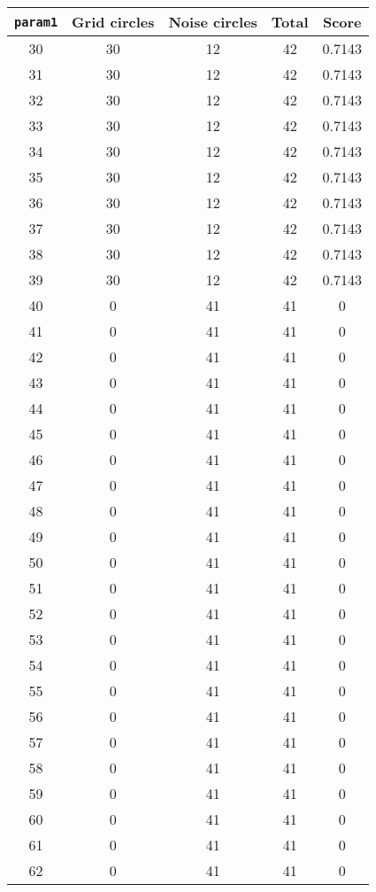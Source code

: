 \documentclass[letterpaper, 12pt]{article}
\begin{document}
\begin{longtable}{|c|c|c|c|c|}
\hline
\textbf{\texttt{param1}} & \textbf{Grid circles} & \textbf{Noise circles} & \textbf{Total} & \textbf{Score} \\
\hline
30 & 30 & 12 & 42 & 0.7143 \\
\hline
31 & 30 & 12 & 42 & 0.7143 \\
\hline
32 & 30 & 12 & 42 & 0.7143 \\
\hline
33 & 30 & 12 & 42 & 0.7143 \\
\hline
34 & 30 & 12 & 42 & 0.7143 \\
\hline
35 & 30 & 12 & 42 & 0.7143 \\
\hline
36 & 30 & 12 & 42 & 0.7143 \\
\hline
37 & 30 & 12 & 42 & 0.7143 \\
\hline
38 & 30 & 12 & 42 & 0.7143 \\
\hline
39 & 30 & 12 & 42 & 0.7143 \\
\hline
40 & 0 & 41 & 41 & 0 \\
\hline
41 & 0 & 41 & 41 & 0 \\
\hline
42 & 0 & 41 & 41 & 0 \\
\hline
43 & 0 & 41 & 41 & 0 \\
\hline
44 & 0 & 41 & 41 & 0 \\
\hline
45 & 0 & 41 & 41 & 0 \\
\hline
46 & 0 & 41 & 41 & 0 \\
\hline
47 & 0 & 41 & 41 & 0 \\
\hline
48 & 0 & 41 & 41 & 0 \\
\hline
49 & 0 & 41 & 41 & 0 \\
\hline
50 & 0 & 41 & 41 & 0 \\
\hline
51 & 0 & 41 & 41 & 0 \\
\hline
52 & 0 & 41 & 41 & 0 \\
\hline
53 & 0 & 41 & 41 & 0 \\
\hline
54 & 0 & 41 & 41 & 0 \\
\hline
55 & 0 & 41 & 41 & 0 \\
\hline
56 & 0 & 41 & 41 & 0 \\
\hline
57 & 0 & 41 & 41 & 0 \\
\hline
58 & 0 & 41 & 41 & 0 \\
\hline
59 & 0 & 41 & 41 & 0 \\
\hline
60 & 0 & 41 & 41 & 0 \\
\hline
61 & 0 & 41 & 41 & 0 \\
\hline
62 & 0 & 41 & 41 & 0 \\

\end{longtable}
\end{document}
